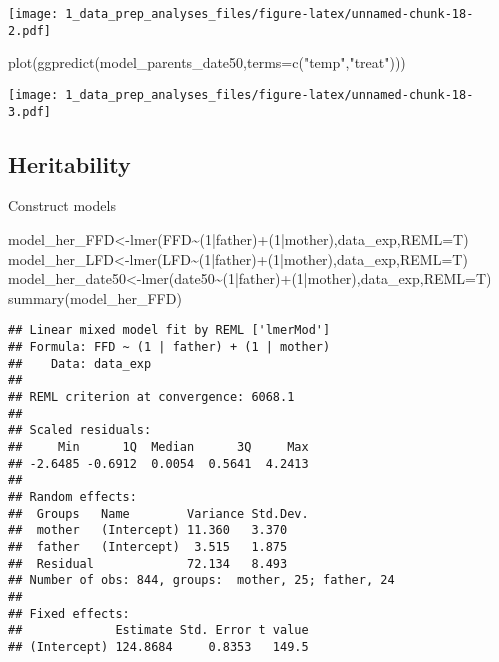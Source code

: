 \documentclass[
]{article}
\newenvironment{Shaded}{\begin{snugshade}}{\end{snugshade}}
\newcommand{\AttributeTok}[1]{\textcolor[rgb]{0.77,0.63,0.00}{#1}}
\newcommand{\DecValTok}[1]{\textcolor[rgb]{0.00,0.00,0.81}{#1}}
\newcommand{\FunctionTok}[1]{\textcolor[rgb]{0.00,0.00,0.00}{#1}}
\newcommand{\NormalTok}[1]{#1}
\newcommand{\OtherTok}[1]{\textcolor[rgb]{0.56,0.35,0.01}{#1}}
\newcommand{\SpecialCharTok}[1]{\textcolor[rgb]{0.00,0.00,0.00}{#1}}
\newcommand{\StringTok}[1]{\textcolor[rgb]{0.31,0.60,0.02}{#1}}
\begin{document}
\texttt{[image: 1\_data\_prep\_analyses\_files/figure-latex/unnamed-chunk-18-2.pdf]}

\begin{Shaded}
\begin{Highlighting}[]
\FunctionTok{plot}\NormalTok{(}\FunctionTok{ggpredict}\NormalTok{(model\_parents\_date50,}\AttributeTok{terms=}\FunctionTok{c}\NormalTok{(}\StringTok{"temp"}\NormalTok{,}\StringTok{"treat"}\NormalTok{)))}
\end{Highlighting}
\end{Shaded}

\texttt{[image: 1\_data\_prep\_analyses\_files/figure-latex/unnamed-chunk-18-3.pdf]}

\hypertarget{heritability}{%
\subsection{Heritability}\label{heritability}}

Construct models

\begin{Shaded}
\begin{Highlighting}[]
\NormalTok{model\_her\_FFD}\OtherTok{\textless{}{-}}\FunctionTok{lmer}\NormalTok{(FFD}\SpecialCharTok{\textasciitilde{}}\NormalTok{(}\DecValTok{1}\SpecialCharTok{|}\NormalTok{father)}\SpecialCharTok{+}\NormalTok{(}\DecValTok{1}\SpecialCharTok{|}\NormalTok{mother),data\_exp,}\AttributeTok{REML=}\NormalTok{T)}
\NormalTok{model\_her\_LFD}\OtherTok{\textless{}{-}}\FunctionTok{lmer}\NormalTok{(LFD}\SpecialCharTok{\textasciitilde{}}\NormalTok{(}\DecValTok{1}\SpecialCharTok{|}\NormalTok{father)}\SpecialCharTok{+}\NormalTok{(}\DecValTok{1}\SpecialCharTok{|}\NormalTok{mother),data\_exp,}\AttributeTok{REML=}\NormalTok{T)}
\NormalTok{model\_her\_date50}\OtherTok{\textless{}{-}}\FunctionTok{lmer}\NormalTok{(date50}\SpecialCharTok{\textasciitilde{}}\NormalTok{(}\DecValTok{1}\SpecialCharTok{|}\NormalTok{father)}\SpecialCharTok{+}\NormalTok{(}\DecValTok{1}\SpecialCharTok{|}\NormalTok{mother),data\_exp,}\AttributeTok{REML=}\NormalTok{T)}
\FunctionTok{summary}\NormalTok{(model\_her\_FFD)}
\end{Highlighting}
\end{Shaded}

\begin{verbatim}
## Linear mixed model fit by REML ['lmerMod']
## Formula: FFD ~ (1 | father) + (1 | mother)
##    Data: data_exp
## 
## REML criterion at convergence: 6068.1
## 
## Scaled residuals: 
##     Min      1Q  Median      3Q     Max 
## -2.6485 -0.6912  0.0054  0.5641  4.2413 
## 
## Random effects:
##  Groups   Name        Variance Std.Dev.
##  mother   (Intercept) 11.360   3.370   
##  father   (Intercept)  3.515   1.875   
##  Residual             72.134   8.493   
## Number of obs: 844, groups:  mother, 25; father, 24
## 
## Fixed effects:
##             Estimate Std. Error t value
## (Intercept) 124.8684     0.8353   149.5
\end{verbatim}
\end{document}
